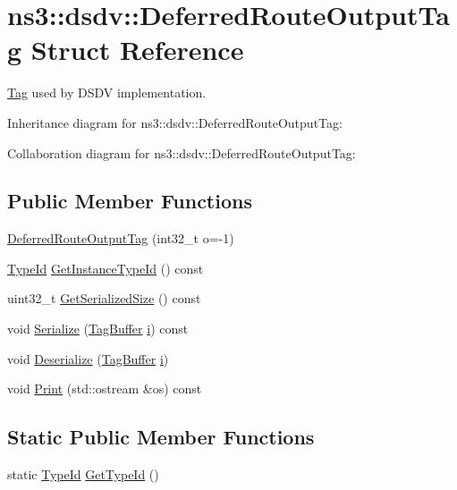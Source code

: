 \hypertarget{structns3_1_1dsdv_1_1DeferredRouteOutputTag}{}\section{ns3\+:\+:dsdv\+:\+:Deferred\+Route\+Output\+Tag Struct Reference}
\label{structns3_1_1dsdv_1_1DeferredRouteOutputTag}


\hyperlink{classns3_1_1Tag}{Tag} used by D\+S\+DV implementation.  




Inheritance diagram for ns3\+:\+:dsdv\+:\+:Deferred\+Route\+Output\+Tag\+:


Collaboration diagram for ns3\+:\+:dsdv\+:\+:Deferred\+Route\+Output\+Tag\+:
\subsection*{Public Member Functions}
\begin{DoxyCompactItemize}
\item 
\hyperlink{structns3_1_1dsdv_1_1DeferredRouteOutputTag_affed43b9a3a1186812ff4953a37b487d}{Deferred\+Route\+Output\+Tag} (int32\+\_\+t o=-\/1)
\item 
\hyperlink{classns3_1_1TypeId}{Type\+Id} \hyperlink{structns3_1_1dsdv_1_1DeferredRouteOutputTag_aa988394e1cd41a0e55b5c56701e47931}{Get\+Instance\+Type\+Id} () const 
\item 
uint32\+\_\+t \hyperlink{structns3_1_1dsdv_1_1DeferredRouteOutputTag_aae0c8a523b1f9657047866a30967e4ac}{Get\+Serialized\+Size} () const 
\item 
void \hyperlink{structns3_1_1dsdv_1_1DeferredRouteOutputTag_a240a12ddced27df9d9838e51070a4113}{Serialize} (\hyperlink{classns3_1_1TagBuffer}{Tag\+Buffer} \hyperlink{lte__uplink__power__control_8m_a6f6ccfcf58b31cb6412107d9d5281426}{i}) const 
\item 
void \hyperlink{structns3_1_1dsdv_1_1DeferredRouteOutputTag_aef933f625f047bb6be8f714d3609cdb5}{Deserialize} (\hyperlink{classns3_1_1TagBuffer}{Tag\+Buffer} \hyperlink{lte__uplink__power__control_8m_a6f6ccfcf58b31cb6412107d9d5281426}{i})
\item 
void \hyperlink{structns3_1_1dsdv_1_1DeferredRouteOutputTag_a148981c6dd2d5f7790b099d901fb6106}{Print} (std\+::ostream \&os) const 
\end{DoxyCompactItemize}
\subsection*{Static Public Member Functions}
\begin{DoxyCompactItemize}
\item 
static \hyperlink{classns3_1_1TypeId}{Type\+Id} \hyperlink{structns3_1_1dsdv_1_1DeferredRouteOutputTag_a89d6635427446ecce5a6ce023eb61631}{Get\+Type\+Id} ()
\end{DoxyCompactItemize}
